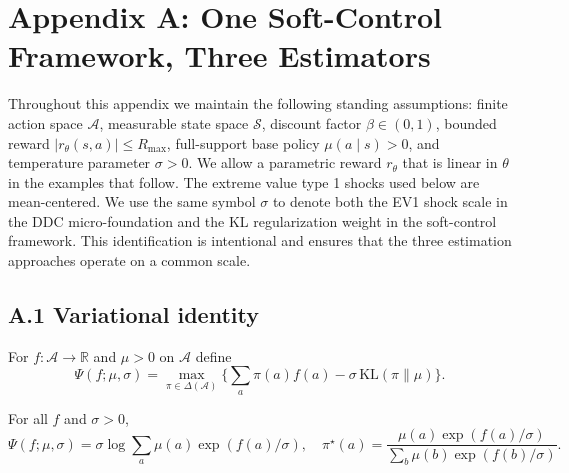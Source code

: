 
\appendix
\section*{Appendix A: One Soft-Control Framework, Three Estimators}

Throughout this appendix we maintain the following standing assumptions: finite action space $\mathcal A$, measurable state space $\mathcal S$, discount factor $\beta\in(0,1)$, bounded reward $|r_\theta(s,a)|\le R_{\max}$, full-support base policy $\mu(a\mid s)>0$, and temperature parameter $\sigma>0$. We allow a parametric reward $r_\theta$ that is linear in $\theta$ in the examples that follow. The extreme value type 1 shocks used below are mean-centered. We use the same symbol $\sigma$ to denote both the EV1 shock scale in the DDC micro-foundation and the KL regularization weight in the soft-control framework. This identification is intentional and ensures that the three estimation approaches operate on a common scale.

\subsection*{A.1 Variational identity}
For $f:\mathcal A\to\mathbb R$ and $\mu>0$ on $\mathcal A$ define
\[
\Psi(f;\mu,\sigma)=\max_{\pi\in\Delta(\mathcal A)}\Big\{\sum_a \pi(a)f(a)-\sigma\,\mathrm{KL}(\pi\|\mu)\Big\}.
\]
\begin{lemma}
\label{lem:var}
For all $f$ and $\sigma>0$,
\[
\Psi(f;\mu,\sigma)=\sigma\log\sum_{a}\mu(a)\exp(f(a)/\sigma),
\quad
\pi^\star(a)=\frac{\mu(a)\exp(f(a)/\sigma)}{\sum_b \mu(b)\exp(f(b)/\sigma)}.
\]
\end{lemma}

